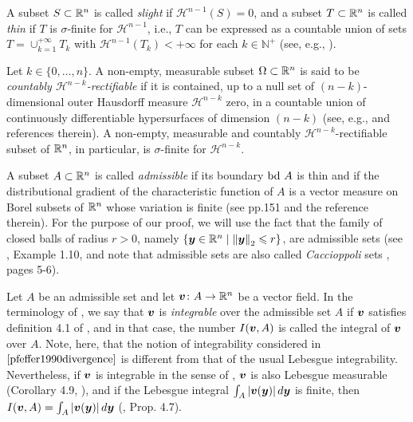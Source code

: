 \bigbreak
\noindent
A subset $S \subset \mathbb{R}^n$ is called \textit{slight} if $\mathcal{H}^{n-1}(S) = 0$, and a subset $T \subset \mathbb{R}^n$ is called \textit{thin} if $T$ is $\sigma$-finite for $\mathcal{H}^{n-1}$, i.e., $T$ can be expressed as a countable union of sets $T = \cup_{k=1}^{+\infty} T_k$ with $\mathcal{H}^{n-1}(T_k) < +\infty$ for each $k \in \mathbb{N}^+$ (see, e.g., \cite{pfeffer1990divergence}).

\bigbreak
\noindent
Let $k \in \{0,\dots,n\}$. A non-empty, measurable subset $\Omega \subset \mathbb{R}^n$ is said to be \textit{countably $\mathcal{H}^{n-k}$-rectifiable} if it is contained, up to a null set of $(n-k)$-dimensional outer Hausdorff measure $\mathcal{H}^{n-k}$ zero, in a countable union of continuously differentiable hypersurfaces of dimension $(n-k)$ (see, e.g., \cite{alberti1992singularities} and references therein). A non-empty, measurable and countably $\mathcal{H}^{n-k}$-rectifiable subset of $\mathbb{R}^n$, in particular, is $\sigma$-finite for $\mathcal{H}^{n-k}$. 

\bigbreak
\noindent
A subset $A\subset \mathbb{R}^n$ is called \textit{admissible} if its boundary $\mathrm{bd~} A$ is thin and if the distributional gradient of the characteristic function of $A$ is a vector measure on Borel subsets of $\mathbb{R}^n$ whose variation is finite (see \cite{pfeffer1990divergence} pp.151 and the reference therein). For the purpose of our proof, we will use the fact that the family of closed balls of radius $r>0$, namely $\{\boldsymbol{y} \in \mathbb{R}^n \mid \left\Vert{\boldsymbol{y}} \right\Vert_{2} \leqslant r\}$, are admissible sets (see \cite{giusti1984minimal}, Example 1.10, and note that admissible sets are also called \textit{Caccioppoli} sets \cite{giusti1984minimal}, pages 5-6).

\bigbreak
\noindent
Let $A$ be an admissible set and let $\boldsymbol{v}\colon A\to\mathbb{R}^n$ be a vector field. In the terminology of \cite{pfeffer1990divergence}, we say that $\boldsymbol{v}$ is \textit{integrable} over the admissible set $A$ if $\boldsymbol{v}$ satisfies definition 4.1 of \cite{pfeffer1990divergence}, and in that case, the number $I(\boldsymbol{v},A)$ is called the integral of $\boldsymbol{v}$ over $A$. Note, here, that the notion of integrability considered in $\cite{pfeffer1990divergence}$ is different from that of the usual Lebesgue integrability. Nevertheless, if $\boldsymbol{v}$ is integrable in the sense of \cite{pfeffer1990divergence}, $\boldsymbol{v}$ is also Lebesgue measurable (Corollary 4.9, \cite{pfeffer1990divergence}), and if the Lebesgue integral $\int_{A}|\boldsymbol{v}(\boldsymbol{y})|\mathop{}\!d{\boldsymbol{y}}$ is finite, then $I(\boldsymbol{v},A) = \int_{A}|\boldsymbol{v}(\boldsymbol{y})|\mathop{}\!d{\boldsymbol{y}}$ (\cite{pfeffer1990divergence}, Prop. 4.7).
 

